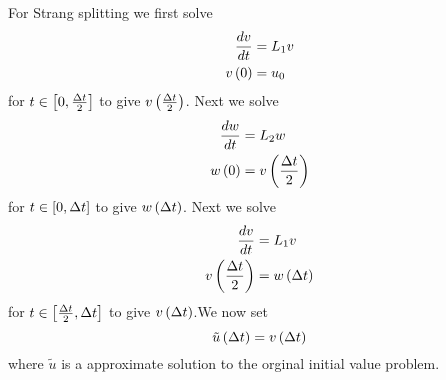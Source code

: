 For Strang splitting we first solve
\begin{align}
   \dfrac{ d v}{d t} &=L_{1}v \\
   v\left( 0 \right) &=u_{0}
\end{align}
for $t\in\left[ 0,\frac{\Delta t}{2} \right]$ to give $ v\left( \frac{\Delta t}{2} \right) $. Next we solve
\begin{align}
   \dfrac{ d w}{d t} &=L_{2}w \\
   w\left( 0 \right) &= v\left( \frac{\Delta t}{2} \right) 
\end{align}
for $t\in\left[ 0,\Delta t \right]$ to give $ w\left( \Delta t \right) $. Next we solve
\begin{align}
   \dfrac{ d v}{d t} &=L_{1}v \\
   v\left( \frac{\Delta t}{2} \right) &= w\left( \Delta t \right) 
\end{align}
for $t\in\left[ \frac{\Delta t}{2},\Delta t \right]$ to give $ v\left( \Delta t \right) $.We now set
\begin{equation}
 \tilde{u}\left( \Delta t \right) = v\left( \Delta t \right) 
\end{equation}
where $\tilde{u}$ is a approximate solution to the orginal initial value
problem. 

